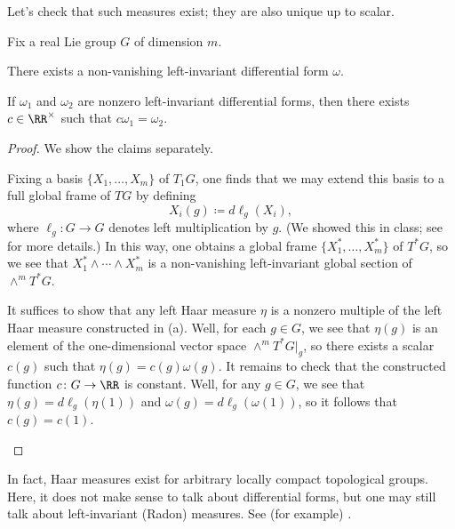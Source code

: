 \documentclass{amsart}
\begin{document}
Let's check that such measures exist; they are also unique up to scalar.
\begin{proposition} \label{prop:haar-unique}
	Fix a real Lie group $G$ of dimension $m$.
	\begin{listalph}
		\item There exists a non-vanishing left-invariant differential form $\omega$.
		\item If $\omega_1$ and $\omega_2$ are nonzero left-invariant differential forms, then there exists $c\in\RR^\times$ such that $c\omega_1=\omega_2$.
	\end{listalph}
\end{proposition}
\begin{proof}
	We show the claims separately.
	\begin{listalph}
		\item Fixing a basis $\{X_1,\ldots,X_m\}$ of $T_1G$, one finds that we may extend this basis to a full global frame of $TG$ by defining
		\[X_i(g)\coloneqq d\ell_g(X_i),\]
		where $\ell_g\colon G\to G$ denotes left multiplication by $g$. (We showed this in class; see \cite[Theorem~8.37]{lee-manifolds} for more details.) In this way, one obtains a global frame $\{X_1^*,\ldots,X_m^*\}$ of $T^*G$, so we see that $X_1^*\land\cdots\land X_m^*$ is a non-vanishing left-invariant global section of $\land^mT^*G$.
		\item It suffices to show that any left Haar measure $\eta$ is a nonzero multiple of the left Haar measure constructed in (a). Well, for each $g\in G$, we see that $\eta(g)$ is an element of the one-dimensional vector space $\land^mT^*G|_g$, so there exists a scalar $c(g)$ such that $\eta(g)=c(g)\omega(g)$. It remains to check that the constructed function $c\colon G\to\RR$ is constant. Well, for any $g\in G$, we see that $\eta(g)=d\ell_g(\eta(1))$ and $\omega(g)=d\ell_g(\omega(1))$, so it follows that $c(g)=c(1)$.
		\qedhere
	\end{listalph}
\end{proof}
\begin{remark}
	In fact, Haar measures exist for arbitrary locally compact topological groups. Here, it does not make sense to talk about differential forms, but one may still talk about left-invariant (Radon) measures. See (for example) \cite[Chapter~1]{de-harmonic-analysis}.
\end{remark}
\end{document}

